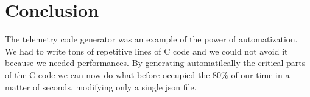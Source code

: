 \section{\huge{Conclusion}}

The telemetry code generator was an example of the power of automatization. We had to write tons of repetitive lines of C code and we could not
avoid it because we needed performances. By generating automatilcally the critical parts of the C code we can now do what before occupied the 80\% 
of our time in a matter of seconds, modifying only a single json file.